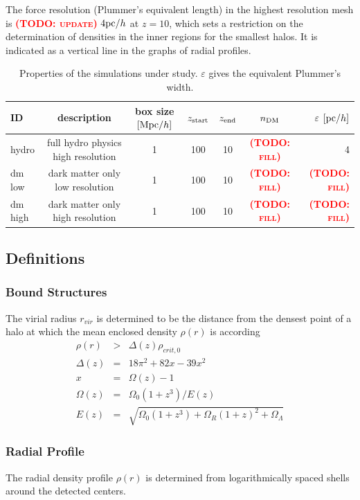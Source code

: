 \documentclass[useAMS,usenatbib]{mn2e}
\newcommand{\TODO}[1]{\textsc{\textbf{\textcolor{red}{(TODO: #1)}}}}
\begin{document}
The force resolution (Plummer's equivalent length) in the highest
resolution mesh is \TODO{update} $4{\rm pc}/h$ at $z=10$, which sets a
restriction on the determination of densities in the inner regions for
the smallest halos. It is indicated as a vertical line in the graphs
of radial profiles.

\begin{table}
  \begin{center} \begin{tabular}{lcccccr} \hline
      ID & description & box size $[{\rm Mpc}/h]$ & $z_{\rm start}$ & $z_{\rm end}$ & $n_{\rm DM}$ & $\varepsilon$ $[{\rm pc}/h]$\\
      \hline
      hydro   & full hydro physics high resolution & 1 & 100 & 10 & \TODO{fill} & 4\\
      dm low  & dark matter only low resolution    & 1 & 100 & 10 & \TODO{fill} & \TODO{fill}\\
      dm high & dark matter only high resolution   & 1 & 100 & 10 & \TODO{fill} & \TODO{fill}\\
      \hline
    \end{tabular} \end{center}
  \caption{\label{tab:simprop}Properties of the simulations under study. $\varepsilon$ gives the equivalent Plummer's width.}
\end{table}


\subsection{Definitions}
\subsubsection{Bound Structures}
The virial radius $r_{vir}$ is determined to be the distance from the densest point of a halo at which the mean enclosed density $\rho(r)$ is according \cite{Bryan1998}
%
\begin{eqnarray}
  \rho(r)&>&\Delta(z)\rho_{crit,0}\\
  \Delta(z)&=&18\pi^2+82x-39x^2\\
  x&=&\Omega(z)-1\\
  \Omega(z)&=&\Omega_0(1+z^3)/E(z)\\
  E(z)&=&\sqrt{\Omega_0(1+z^3)+\Omega_R(1+z)^2+\Omega_\Lambda}
\end{eqnarray}

\subsubsection{Radial Profile}
The radial density profile $\rho(r)$ is determined from
logarithmically spaced shells around the detected centers.
\end{document}
